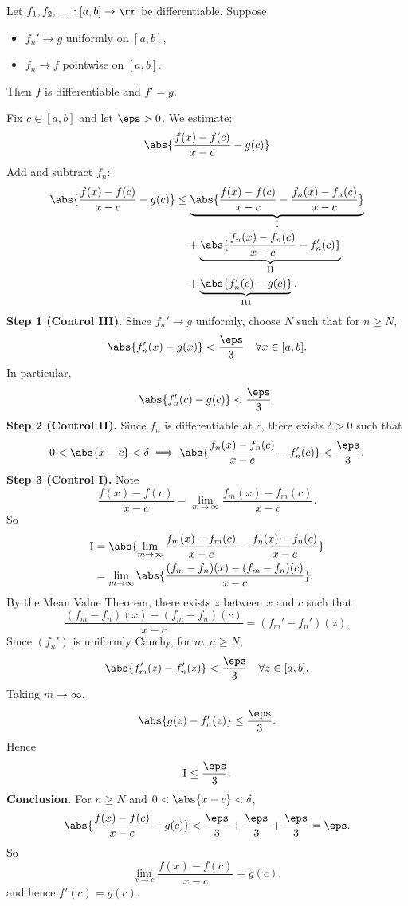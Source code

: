 

\begin{theorem}{
	Let $f_1, f_2, \ldots : [a,b] \to \rr$ be differentiable. Suppose
	\begin{itemize}
		\item $f_n' \to g$ uniformly on $[a,b]$,
		\item $f_n \to f$ pointwise on $[a,b]$.
	\end{itemize}
	Then $f$ is differentiable and $f' = g$.
}
	Fix $c \in [a,b]$ and let $\eps > 0$.
	We estimate:
	\[
		\abs{
			\frac{f(x)-f(c)}{x-c} - g(c)
		}
	\]
	Add and subtract $f_n$:
	\begin{align*}
		\abs{
			\frac{f(x)-f(c)}{x-c} - g(c)
		}
		&\leq
		\underbrace{
			\abs{
				\frac{f(x)-f(c)}{x-c}
				-
				\frac{f_n(x)-f_n(c)}{x-c}
			}
		}_{\text{I}}
		\\
		&\quad +
		\underbrace{
			\abs{
				\frac{f_n(x)-f_n(c)}{x-c} - f_n'(c)
			}
		}_{\text{II}}
		\\
		&\quad +
		\underbrace{
			\abs{
				f_n'(c) - g(c)
			}
		}_{\text{III}}.
	\end{align*}
	\textbf{Step 1 (Control III).}
	Since $f_n' \to g$ uniformly, choose $N$ such that for $n \geq N$,
	\[
		\abs{f_n'(x) - g(x)} < \frac{\eps}{3}
		\quad \forall x \in [a,b].
	\]
	In particular,
	\[
		\abs{f_n'(c) - g(c)} < \frac{\eps}{3}.
	\]
	\textbf{Step 2 (Control II).}
	Since $f_n$ is differentiable at $c$, there exists $\delta > 0$ such that
	\[
		0 < \abs{x-c} < \delta
		\implies
		\abs{
			\frac{f_n(x)-f_n(c)}{x-c} - f_n'(c)
		}
		< \frac{\eps}{3}.
	\]
	\textbf{Step 3 (Control I).}
	Note
	\[
		\frac{f(x)-f(c)}{x-c}
		=
		\lim_{m\to\infty}
		\frac{f_m(x)-f_m(c)}{x-c}.
	\]
	So
	\begin{align*}
		\text{I}
		&=
		\abs{
			\lim_{m\to\infty}
			\frac{f_m(x)-f_m(c)}{x-c}
			-
			\frac{f_n(x)-f_n(c)}{x-c}
		}\\
		&=
		\lim_{m\to\infty}
		\abs{
			\frac{
				(f_m-f_n)(x) - (f_m-f_n)(c)
			}{x-c}
		}.
	\end{align*}
	By the Mean Value Theorem, there exists $z$ between $x$ and $c$ such that
	\[
		\frac{
			(f_m-f_n)(x) - (f_m-f_n)(c)
		}{x-c}
		=
		(f_m' - f_n')(z).
	\]
	Since $(f_n')$ is uniformly Cauchy, for $m,n \geq N$,
	\[
		\abs{f_m'(z) - f_n'(z)} < \frac{\eps}{3}
		\quad \forall z \in [a,b].
	\]
	Taking $m \to \infty$,
	\[
		\abs{g(z) - f_n'(z)} \leq \frac{\eps}{3}.
	\]
	Hence
	\[
		\text{I} \leq \frac{\eps}{3}.
	\]
	\textbf{Conclusion.}
	For $n \geq N$ and $0 < \abs{x-c} < \delta$,
	\[
		\abs{
			\frac{f(x)-f(c)}{x-c} - g(c)
		}
		< \frac{\eps}{3} + \frac{\eps}{3} + \frac{\eps}{3}
		= \eps.
	\]
	So
	\[
		\lim_{x\to c}
		\frac{f(x)-f(c)}{x-c}
		= g(c),
	\]
	and hence $f'(c) = g(c)$.
\end{theorem}